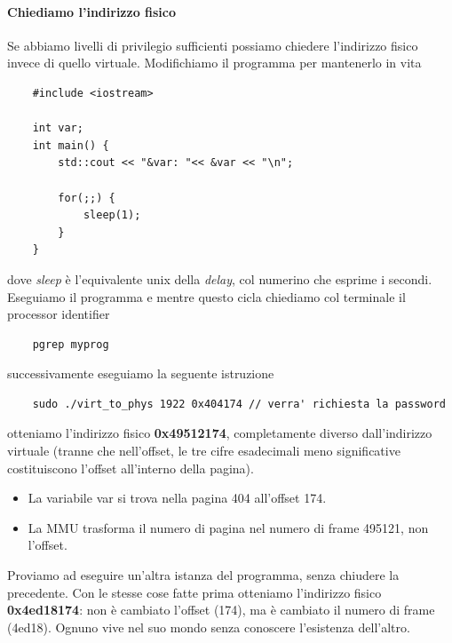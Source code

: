\paragraph{Chiediamo l'indirizzo fisico} Se abbiamo livelli di privilegio sufficienti possiamo chiedere l'indirizzo fisico invece di quello virtuale. Modifichiamo il programma per mantenerlo in vita
\begin{verbatim}
	#include <iostream>
	
	int var;
	int main() {
		std::cout << "&var: "<< &var << "\n";
		
		for(;;) {
			sleep(1);
		}
	}
\end{verbatim}
dove \emph{sleep} è l'equivalente unix della \emph{delay}, col numerino che esprime i secondi. Eseguiamo il programma e mentre questo cicla chiediamo col terminale il processor identifier
\begin{verbatim}
	pgrep myprog
\end{verbatim}
successivamente eseguiamo la seguente istruzione
\begin{verbatim}
	sudo ./virt_to_phys 1922 0x404174 // verra' richiesta la password
\end{verbatim}
otteniamo l'indirizzo fisico \textbf{0x49512174}, completamente diverso dall'indirizzo virtuale (tranne che nell'offset, le tre cifre esadecimali meno significative costituiscono l'offset all'interno della pagina).
\begin{itemize}
	\item La variabile var si trova nella pagina 404 all'offset 174.
	\item La MMU trasforma il numero di pagina nel numero di frame 495121, non l'offset.
\end{itemize}
Proviamo ad eseguire un'altra istanza del programma, senza chiudere la precedente. Con le stesse cose fatte prima otteniamo l'indirizzo fisico \textbf{0x4ed18174}: non è cambiato l'offset (174), ma è cambiato il numero di frame (4ed18). Ognuno vive nel suo mondo senza conoscere l'esistenza dell'altro.

